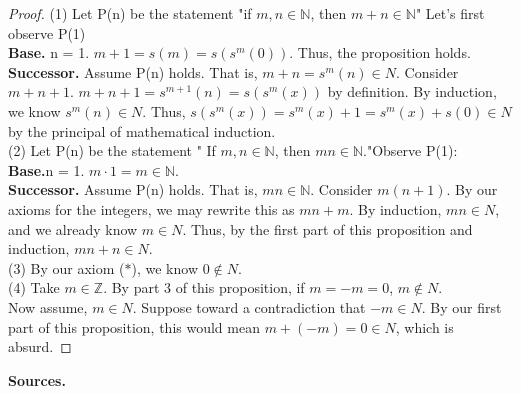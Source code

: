 \documentclass[12pt]{amsart}
\newcommand{\N}{\mathbb{N}}
\newcommand{\Z}{\mathbb{Z}}
\begin{document}
\begin{proof}
	(1) Let P(n) be the statement "if $m,n \in \N$, then $m + n \in \N$" Let's first observe P(1)
	\\\textbf{Base.} n = 1. $m + 1 = s(m) = s(s^{m}(0))$. Thus, the proposition holds.
	\\\textbf{Successor.} Assume P(n) holds. That is, $m + n  = s^m(n) \in N$. Consider $m + n + 1$. $m + n + 1 = s^{m+1}(n) = s(s^m(x))$ by definition. By induction, we know $s^m(n) \in N$. Thus, $s(s^m(x)) = s^m(x) + 1 = s^m(x) + s(0) \in N$ by the principal of mathematical induction.
	\\\indent (2) Let P(n) be the statement " If $m,n \in \N$, then $mn \in \N$."Observe P(1):
	\\\textbf{Base.}n = 1. $m \cdot 1 = m \in \N$.
	\\\textbf{Successor.} Assume P(n) holds. That is, $mn \in \N$. Consider $m(n+1)$. By our axioms for the integers, we may rewrite this as $mn + m$. By induction, $mn \in N$, and we already know $m \in N$. Thus, by the first part of this proposition and induction, $mn + n \in N$.
	\\\indent (3) By our axiom ($\ast$), we know $0 \notin N$.
	\\\indent (4) Take $m \in \Z$. By part 3 of this proposition, if $m  = - m = 0$, $m \notin N$.
	\\\indent Now assume, $m \in N$. Suppose toward a contradiction that $- m \in N$. By our first part of this proposition, this would mean $m + (- m) = 0 \in N$, which is absurd.
\end{proof}
\textbf{Sources.}
\end{document}
